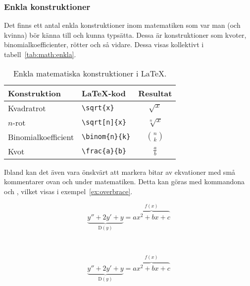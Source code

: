 \documentclass[../../a4.tex]{subfiles}
\begin{document}
\subsubsection{Enkla konstruktioner} %
Det finns ett antal enkla konstruktioner inom matematiken som var man
(och kvinna) bör känna till och kunna typsätta. Dessa är konstruktioner
som kvoter, binomialkoefficienter, rötter och så vidare. Dessa visas
kollektivt i tabell~\vref{tab:math:enkla}.

\begin{table}[p]
	\centering
	\caption{Enkla matematiska konstruktioner i \LaTeX{}.}
	\label{tab:math:enkla}
	\begin{tabular}{llc}
		\toprule 
		Konstruktion & \LaTeX-kod & Resultat  \\
		\midrule 
		Kvadratrot & \verb|\sqrt{x}| & \(\sqrt{x}\) \\
		\(n\)-rot & \verb|\sqrt[n]{x}| & \(\sqrt[n]{x}\) \\
		Binomialkoefficient & \verb|\binom{n}{k}| & \(\binom{n}{k}\) \\
		Kvot & \verb|\frac{a}{b}| & \(\frac{a}{b}\) \\
		\bottomrule 
	\end{tabular}
\end{table}

Ibland kan det även vara önskvärt att markera bitar av ekvationer med små
kommentarer ovan och under matematiken. Detta kan göras med kommandona
 och , vilket visas i
exempel~\vref{ex:overbrace}.

\begin{kod}[p]
	\centering
	\begin{minipage}{0.8\textwidth} %
		\begin{latexcode}
\begin{equation*}
\underbrace{y'' + 2y' + y}_{\mathrm{D}(y)}
= \overbrace{ax^2+bx+c}^{f(x)}
\end{equation*}
		\end{latexcode}
	\end{minipage}
	\medskip\\
	\begin{minipage}{0.8\textwidth} %
		\begin{equation*}
			\underbrace{y'' + 2y' + y}_{\mathrm{D}(y)}
			= \overbrace{ax^2+bx+c}^{f(x)}
		\end{equation*}
	\end{minipage}		
	\caption{Annotering med  och .}
	\label{ex:overbrace}
\end{kod}
\end{document}
